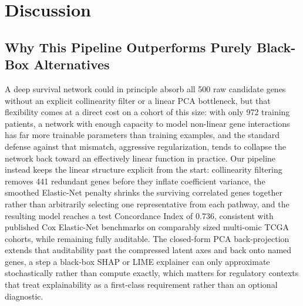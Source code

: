 \documentclass[sigconf, review=true]{acmart}
\begin{document}
\section{Discussion}

\subsection{Why This Pipeline Outperforms Purely Black-Box Alternatives}
A deep survival network could in principle absorb all 500 raw candidate genes without an explicit collinearity filter or a linear PCA bottleneck, but that flexibility comes at a direct cost on a cohort of this size: with only 972 training patients, a network with enough capacity to model non-linear gene interactions has far more trainable parameters than training examples, and the standard defense against that mismatch, aggressive regularization, tends to collapse the network back toward an effectively linear function in practice. Our pipeline instead keeps the linear structure explicit from the start: collinearity filtering removes 441 redundant genes before they inflate coefficient variance, the smoothed Elastic-Net penalty shrinks the surviving correlated genes together rather than arbitrarily selecting one representative from each pathway, and the resulting model reaches a test Concordance Index of $0.736$, consistent with published Cox Elastic-Net benchmarks on comparably sized multi-omic TCGA cohorts, while remaining fully auditable. The closed-form PCA back-projection extends that auditability past the compressed latent axes and back onto named genes, a step a black-box SHAP or LIME explainer can only approximate stochastically rather than compute exactly, which matters for regulatory contexts that treat explainability as a first-class requirement rather than an optional diagnostic.
\end{document}
